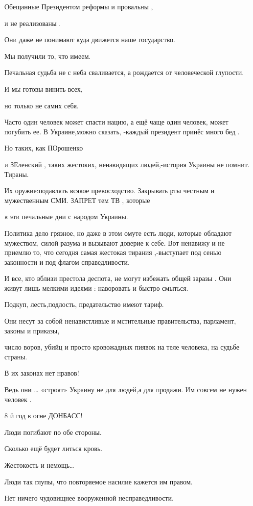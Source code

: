 Обещанные Президентом реформы и провальны , 

и не реализованы . 

Они даже не понимают куда движется наше государство.

 Мы получили то, что имеем.

Печальная судьба не с неба сваливается, а рождается от человеческой глупости. 

И мы готовы винить всех, 

но только не самих себя.

Часто один человек может спасти нацию, а ещё чаще один человек, может погубить
ее.  В Украине,можно сказать, -каждый  президент принёс много бед .

Но таких, как ПОрошенко  

и ЗЕленский , таких жестоких, ненавидящих людей,-история Украины не помнит.
Тираны.

Их оружие:подавлять всякое превосходство. Закрывать рты честным и мужественным
СМИ.  ЗАПРЕТ тем ТВ , которые 

в эти печальные дни  с народом Украины.  

Политика дело грязное, но даже в этом омуте есть люди, которые обладают
мужеством, силой разума и вызывают доверие к себе. Вот ненавижу и не приемлю
то, что сегодня  самая жестокая тирания ,-выступает под сенью законности и под
флагом справедливости. 

И все, кто вблизи престола деспота, не могут избежать общей заразы . Они живут
лишь мелкими идеями : наворовать и быстро смыться.

Подкуп, лесть,подлость, предательство имеют тариф.

Они несут за собой ненавистливые и мстительные правительства, парламент, законы
и приказы,

число воров, убийц и просто кровожадных пиявок на теле человека, на судьбе
страны.  

В их законах нет нравов!

Ведь они … «строят» Украину не для людей,а для продажи. Им совсем не нужен
человек .

8 й год в огне ДОНБАСС! 

Люди погибают по обе стороны.  

Сколько ещё будет литься кровь. 

Жестокость и немощь… 

Люди так глупы, что повторяемое насилие кажется им правом. 

Нет ничего чудовищнее вооруженной несправедливости.

